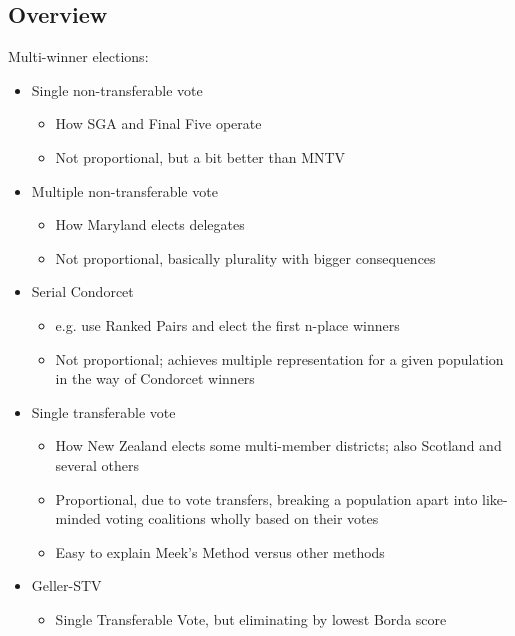 \subsection{Overview}

Multi-winner elections:
\begin{itemize}
    \item Single non-transferable vote
    \begin{itemize}
        \item How SGA and Final Five operate
        \item Not proportional, but a bit better than MNTV
    \end{itemize}

    \item Multiple non-transferable vote
    \begin{itemize}
        \item How Maryland elects delegates
        \item Not proportional, basically plurality with bigger consequences
    \end{itemize}

    \item Serial Condorcet
    \begin{itemize}
        \item e.g. use Ranked Pairs and elect the first n-place winners
        \item Not proportional; achieves multiple representation for a given population in the way of Condorcet winners
    \end{itemize}

    \item Single transferable vote
    \begin{itemize}
        \item How New Zealand elects some multi-member districts; also Scotland and several others
        \item Proportional, due to vote transfers, breaking a population apart into like-minded voting coalitions wholly based on their votes
        \item Easy to explain Meek's Method versus other methods
    \end{itemize}

    \item Geller-STV
    \begin{itemize}
        \item Single Transferable Vote, but eliminating by lowest Borda score


\end{itemize}
\end{itemize}
